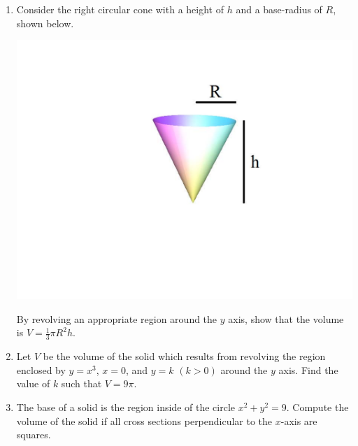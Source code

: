 \documentclass[12pt]{article}
\newif\ifans
\begin{document}
\begin{enumerate}
\item Consider the right circular cone with a height of $h$ and a base-radius of $R$, shown below.
\begin{center}
\includegraphics[scale=0.5]{cone.pdf}
\end{center}
By revolving an appropriate region around the $y$ axis, show that the volume is $V=\frac{1}{3}\pi R^2h$.

\ifans{\fbox{\parbox{1\linewidth}{We revolve the region enclosed by the line $y=\frac{h}{R}x$, $y=h$ and $x=0$ around the $y$-axis.
\begin{align*}
V&=\pi\int_0^h \left(\frac{R}{h}y\right)^2 \,dy\\
&=\pi\int_0^h \frac{R^2}{h^2}y^2 \,dy\\
&=\left.\frac{R^2\pi}{3h^2}y^3\right|_{y=0}^{y=h}\\
&=\frac{R^2\pi}{3h^2}h^3\\
&=\frac{1}{3}\pi R^2h
\end{align*}
}}} \fi

\item Let $V$ be the volume of the solid which results from revolving the region enclosed by $y=x^3$, $x=0$, and $y=k$ $(k>0)$ around the $y$ axis.  Find the value of $k$ such that $V=9\pi$.

\ifans{\fbox{$k=15^{3/5}$}} \fi

\item The base of a solid is the region inside of the circle $x^2+y^2=9$.  Compute the volume of the solid if all cross sections perpendicular to the $x$-axis are squares.


\end{enumerate}
\end{document}

